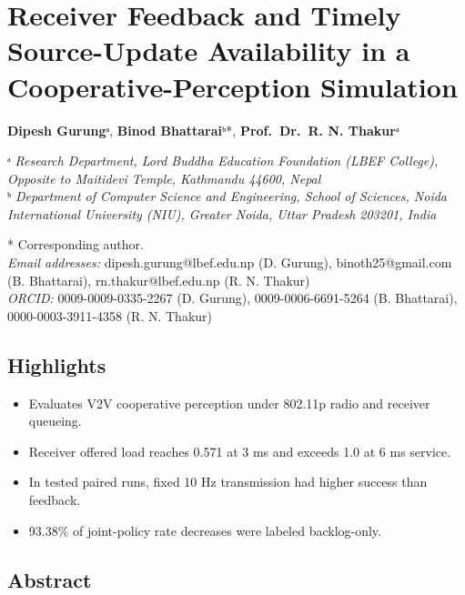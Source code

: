 \documentclass[
]{article}
\author{}
\date{}
\providecommand{\tightlist}{%
  \setlength{\itemsep}{0pt}\setlength{\parskip}{0pt}}
\begin{document}
\section{Receiver Feedback and Timely Source-Update Availability in a
Cooperative-Perception
Simulation}\label{receiver-feedback-and-timely-source-update-availability-in-a-cooperative-perception-simulation}

\textbf{Dipesh Gurung}ᵃ, \textbf{Binod Bhattarai}ᵇ*,
\textbf{Prof.~Dr.~R. N. Thakur}ᵃ

ᵃ \emph{Research Department, Lord Buddha Education Foundation (LBEF
College), Opposite to Maitidevi Temple, Kathmandu 44600, Nepal}\\
ᵇ \emph{Department of Computer Science and Engineering, School of
Sciences, Noida International University (NIU), Greater Noida, Uttar
Pradesh 203201, India}

* Corresponding author.\\
\emph{Email addresses:} dipesh.gurung@lbef.edu.np (D. Gurung),
binoth25@gmail.com (B. Bhattarai), rn.thakur@lbef.edu.np (R. N.
Thakur)\\
\emph{ORCID:} 0009-0009-0335-2267 (D. Gurung), 0009-0006-6691-5264 (B.
Bhattarai), 0000-0003-3911-4358 (R. N. Thakur)

\subsection{Highlights}\label{highlights}

\begin{itemize}
\tightlist
\item
  Evaluates V2V cooperative perception under 802.11p radio and receiver
  queueing.
\item
  Receiver offered load reaches 0.571 at 3 ms and exceeds 1.0 at 6 ms
  service.
\item
  In tested paired runs, fixed 10 Hz transmission had higher success
  than feedback.
\item
  93.38\% of joint-policy rate decreases were labeled backlog-only.
\end{itemize}

\subsection{Abstract}\label{abstract}
\end{document}
